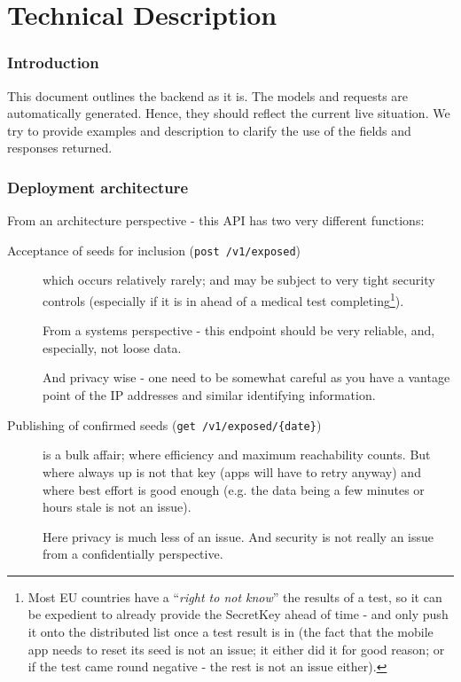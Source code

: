 \part{Technical Description}
\section{Introduction}
This document outlines the backend as it is. The models and requests are automatically generated. Hence, they should reflect the current live situation. We try to provide examples and description to clarify the use of the fields and responses returned.

\section{Deployment architecture}

From an architecture perspective - this API has two very different functions:

\begin{description}
\item[Acceptance of seeds for inclusion (\texttt{post /v1/exposed})] which occurs relatively rarely; and may be subject to very tight security controls (especially if it is in ahead of a medical test completing\footnote{Most EU countries have a ``\emph{right to not know}'' the results of a test, so it can be expedient to already provide the SecretKey ahead of time - and only push it onto the distributed list once a test result is in (the fact that the mobile app needs to reset its seed is not an issue; it either did it for good reason; or if the test came round negative - the rest is not an issue either).}). 

From a systems perspective - this endpoint should be very reliable, and, especially, not loose data. 

And privacy wise - one need to be somewhat careful as you have a vantage point of the IP addresses and similar identifying information. 

\item[Publishing of confirmed seeds (\texttt{get /v1/exposed/\{date\}})] is a bulk affair; where efficiency and maximum reachability counts. But where always up is not that key (apps will have to retry anyway) and where best effort is good enough (e.g. the data being a few minutes or hours stale is not an issue).

Here privacy is much less of an issue. And security is not really an issue from a confidentially perspective. 

\end{description}

